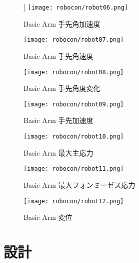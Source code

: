\documentclass[10pt,b5paper,papersize,dvipdfmx]{jsbook}
\begin{document}
\begin{figure}[htbp]]
  \centering
  \texttt{[image: robocon/robot06.png]}
  \caption{Basic Arm 手先角加速度}
  \label{Basic Arm 手先角加速度}
\end{figure}
\begin{figure}[htbp]
  \centering
  \texttt{[image: robocon/robot07.png]}
  \caption{Basic Arm 手先角速度}
  \label{fig:Basic Arm 手先角速度}
\end{figure}
\begin{figure}[htbp]
  \centering
  \texttt{[image: robocon/robot08.png]}
  \caption{Basic Arm 手先角度変化}
  \label{fig:Basic Arm 手先角度変化2}
\end{figure}
\begin{figure}[htbp]
  \centering
  \texttt{[image: robocon/robot09.png]}
  \caption{Basic Arm 手先加速度}
  \label{fig:Basic Arm 手先加速度}
\end{figure}
\begin{figure}[htbp]
  \centering
  \texttt{[image: robocon/robot10.png]}
  \caption{Basic Arm 最大主応力}
  \label{fig:Basic Arm 最大主応力}
\end{figure}
\begin{figure}[htbp]
  \centering
  \texttt{[image: robocon/robot11.png]}
  \caption{Basic Arm 最大フォンミーゼス応力}
  \label{fig:Basic Arm 最大フォンミーゼス応力}
\end{figure}
\begin{figure}[htbp]
  \centering
  \texttt{[image: robocon/robot12.png]}
  \caption{Basic Arm 変位}
  \label{fig:Basic Arm 変位}
\end{figure}
\clearpage
\section{設計}
\end{document}
